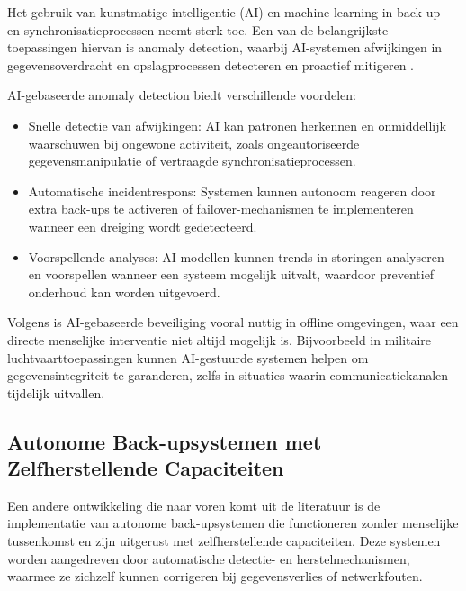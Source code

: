 Het gebruik van kunstmatige intelligentie (AI) en machine learning in back-up- en synchronisatieprocessen neemt sterk toe. Een van de belangrijkste toepassingen hiervan is anomaly detection, waarbij AI-systemen afwijkingen in gegevensoverdracht en opslagprocessen detecteren en proactief mitigeren \autocite{VinayakBhuvi}.

AI-gebaseerde anomaly detection biedt verschillende voordelen:
\begin{itemize}
    \item Snelle detectie van afwijkingen: AI kan patronen herkennen en onmiddellijk waarschuwen bij ongewone activiteit, zoals ongeautoriseerde gegevensmanipulatie of vertraagde synchronisatieprocessen.
    \item Automatische incidentrespons: Systemen kunnen autonoom reageren door extra back-ups te activeren of failover-mechanismen te implementeren wanneer een dreiging wordt gedetecteerd.
    \item Voorspellende analyses: AI-modellen kunnen trends in storingen analyseren en voorspellen wanneer een systeem mogelijk uitvalt, waardoor preventief onderhoud kan worden uitgevoerd.
\end{itemize}

Volgens \textcite{Abdelaziz48PP100_116} is AI-gebaseerde beveiliging vooral nuttig in offline omgevingen, waar een directe menselijke interventie niet altijd mogelijk is. Bijvoorbeeld in militaire luchtvaarttoepassingen kunnen AI-gestuurde systemen helpen om gegevensintegriteit te garanderen, zelfs in situaties waarin communicatiekanalen tijdelijk uitvallen.

\subsection{Autonome Back-upsystemen met Zelfherstellende Capaciteiten}
\label{subsec:autonomous-backups}

Een andere ontwikkeling die naar voren komt uit de literatuur is de implementatie van autonome back-upsystemen die functioneren zonder menselijke tussenkomst en zijn uitgerust met zelfherstellende capaciteiten. Deze systemen worden aangedreven door automatische detectie- en herstelmechanismen, waarmee ze zichzelf kunnen corrigeren bij gegevensverlies of netwerkfouten.

